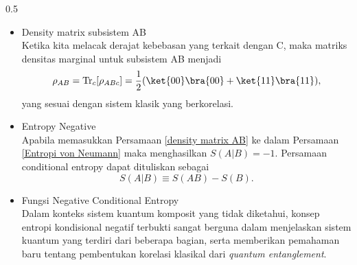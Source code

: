 \begin{frame}
\begin{columns}[T]
   \begin{column}{0.5\textwidth}
        \begin{itemize} \tiny \justifying
            \item Density matrix  subsistem AB\\
                Ketika kita melacak derajat kebebasan yang terkait dengan C, maka matriks densitas marginal untuk subsistem AB menjadi
                    \begin{equation}
                        \rho_{AB}=\text{Tr}_c[\rho_{ABc}]=\frac{1}{2}(\ket{00}\bra{00}+\ket{11}\bra{11}),
                        \label{density matrix AB}
                    \end{equation} 
                yang sesuai dengan sistem klasik yang berkorelasi.
            \item Entropy Negative\\
                Apabila memasukkan Persamaan \ref{density matrix AB} ke dalam Persamaan \ref{Entropi von Neumann} maka menghasilkan $S(A|B)=-1$. Persamaan conditional entropy dapat dituliskan sebagai
                \begin{equation}
                    S(A|B) \equiv S(AB) - S(B).
                \end{equation}
             \item Fungsi Negative Conditional Entropy\\
                Dalam konteks sistem kuantum komposit yang tidak diketahui, konsep entropi kondisional negatif terbukti sangat berguna dalam menjelaskan sistem kuantum yang terdiri dari beberapa bagian, serta memberikan pemahaman baru tentang pembentukan korelasi klasikal dari \textit{quantum entanglement}.
        \end{itemize}
    \end{column}
  \end{columns}   
\end{frame}

